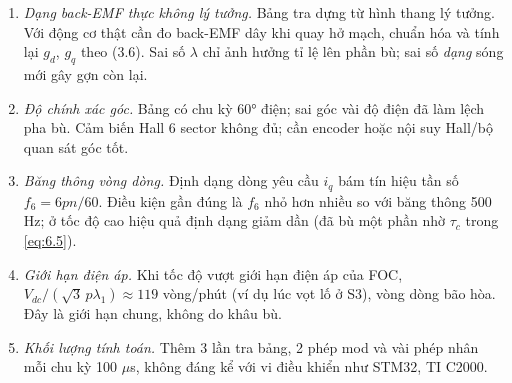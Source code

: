 \begin{ghichu}

\begin{enumerate}[leftmargin=*]
\item \emph{Dạng back-EMF thực không lý tưởng.} Bảng tra dựng từ hình thang lý tưởng. Với động cơ thật cần đo back-EMF dây khi quay hở mạch, chuẩn hóa và tính lại $g_d$, $g_q$ theo (3.6). Sai số $\lambda$ chỉ ảnh hưởng tỉ lệ lên phần bù; sai số \emph{dạng} sóng mới gây gợn còn lại.
\item \emph{Độ chính xác góc.} Bảng có chu kỳ 60° điện; sai góc vài độ điện đã làm lệch pha bù. Cảm biến Hall 6 sector không đủ; cần encoder hoặc nội suy Hall/bộ quan sát góc tốt.
\item \emph{Băng thông vòng dòng.} Định dạng dòng yêu cầu $i_q$ bám tín hiệu tần số $f_6 = 6pn/60$. Điều kiện gần đúng là $f_6$ nhỏ hơn nhiều so với băng thông 500 Hz; ở tốc độ cao hiệu quả định dạng giảm dần (đã bù một phần nhờ $\tau_c$ trong \eqref{eq:6.5}).
\item \emph{Giới hạn điện áp.} Khi tốc độ vượt giới hạn điện áp của FOC, $V_{dc}/(\sqrt3\,p\lambda_1) \approx 119$ vòng/phút (ví dụ lúc vọt lố ở S3), vòng dòng bão hòa. Đây là giới hạn chung, không do khâu bù.
\item \emph{Khối lượng tính toán.} Thêm 3 lần tra bảng, 2 phép mod và vài phép nhân mỗi chu kỳ 100 $\mu$s, không đáng kể với vi điều khiển như STM32, TI C2000.
\end{enumerate}
\end{ghichu}

